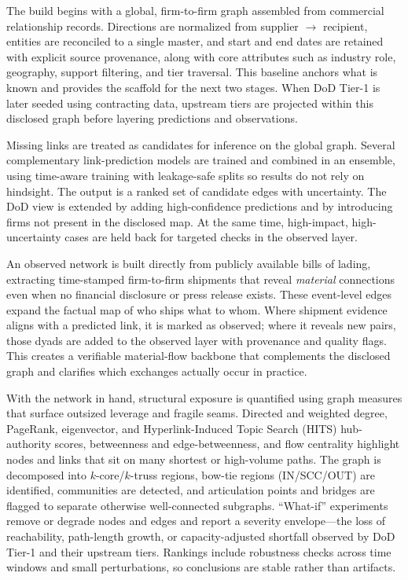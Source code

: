 The build begins with a global, firm-to-firm graph assembled from commercial relationship records. Directions are normalized from supplier $\rightarrow$ recipient, entities are reconciled to a single master, and start and end dates are retained with explicit source provenance, along with core attributes such as industry role, geography, support filtering, and tier traversal. This baseline anchors what is known and provides the scaffold for the next two stages. When DoD Tier-1 is later seeded using contracting data, upstream tiers are projected within this disclosed graph before layering predictions and observations.

Missing links are treated as candidates for inference on the global graph. Several complementary link-prediction models are trained and combined in an ensemble, using time-aware training with leakage-safe splits so results do not rely on hindsight. The output is a ranked set of candidate edges with uncertainty. The DoD view is extended by adding high-confidence predictions and by introducing firms not present in the disclosed map. At the same time, high-impact, high-uncertainty cases are held back for targeted checks in the observed layer.

An observed network is built directly from publicly available bills of lading, extracting time-stamped firm-to-firm shipments that reveal \emph{material} connections even when no financial disclosure or press release exists. These event-level edges expand the factual map of who ships what to whom. Where shipment evidence aligns with a predicted link, it is marked as observed; where it reveals new pairs, those dyads are added to the observed layer with provenance and quality flags. This creates a verifiable material-flow backbone that complements the disclosed graph and clarifies which exchanges actually occur in practice.

With the network in hand, structural exposure is quantified using graph measures that surface outsized leverage and fragile seams. Directed and weighted degree, PageRank, eigenvector, and Hyperlink-Induced Topic Search (HITS) hub-authority scores, betweenness and edge-betweenness, and flow centrality highlight nodes and links that sit on many shortest or high-volume paths. The graph is decomposed into $k$-core/$k$-truss regions, bow-tie regions (IN/SCC/OUT) are identified, communities are detected, and articulation points and bridges are flagged to separate otherwise well-connected subgraphs. ``What-if'' experiments remove or degrade nodes and edges and report a severity envelope---the loss of reachability, path-length growth, or capacity-adjusted shortfall observed by DoD Tier-1 and their upstream tiers. Rankings include robustness checks across time windows and small perturbations, so conclusions are stable rather than artifacts.

